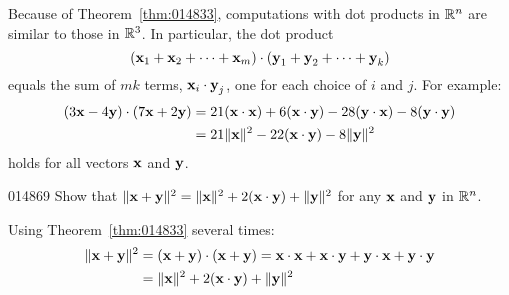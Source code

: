Because of Theorem~\ref{thm:014833}, computations with dot products in $\mathbb{R}^n$ are similar to those in $\mathbb{R}^3$. In particular, the dot product
\begin{equation*}
(\textbf{x}_1 + \textbf{x}_2 + \dots + \textbf{x}_m) \cdot (\textbf{y}_1 + \textbf{y}_2 + \dots + \textbf{y}_k)
\end{equation*}
equals the sum of $mk$ terms, $\textbf{x}_{i} \cdot \textbf{y}_{j}$, one for each choice of $i$ and $j$. For example:
\begin{align*}
(3\textbf{x} - 4\textbf{y}) \cdot (7\textbf{x} + 2\textbf{y}) & = 21(\textbf{x} \cdot \textbf{x}) + 6(\textbf{x} \cdot \textbf{y}) - 28(\textbf{y} \cdot \textbf{x}) - 8(\textbf{y} \cdot \textbf{y}) \\
&= 21 \|\textbf{x}\|^2 - 22(\textbf{x} \cdot \textbf{y}) - 8\|\textbf{y}\|^2
\end{align*}
holds for all vectors $\textbf{x}$ and $\textbf{y}$.

\begin{example}{}{014869}
Show that $\|\textbf{x} + \textbf{y}\|^{2} = \|\textbf{x}\|^{2} + 2(\textbf{x} \cdot \textbf{y}) + \|\textbf{y}\|^{2}$ for any $\textbf{x}$ and $\textbf{y}$ in $\mathbb{R}^n$.

\begin{solution}
Using Theorem~\ref{thm:014833} several times:
\begin{align*}
\|\textbf{x} + \textbf{y}\|^2 &= (\textbf{x} + \textbf{y}) \cdot (\textbf{x} + \textbf{y}) = \textbf{x} \cdot \textbf{x} + \textbf{x} \cdot \textbf{y} + \textbf{y} \cdot \textbf{x} + \textbf{y} \cdot \textbf{y} \\
&= \|\textbf{x}\|^2 + 2(\textbf{x} \cdot \textbf{y}) + \|\textbf{y}\|^2
\end{align*}
\end{solution}
\end{example}

